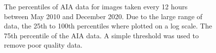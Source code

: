 \documentclass[11pt,a4paper,onecolumn]{report}
\begin{document}
\begin{figure}[t]%
  \qquad
  \qquad

  \caption[]{ The percentiles of AIA data for images
  taken every 12 hours between May 2010 and December 2020. Due to the large
  range of data, the 25th to 100th percentiles where plotted on a log scale.
   The 75th percentile of the AIA data. A simple
  threshold was used to remove poor quality data.}
  \label{fig:aia_data_prep}
\end{figure}
\end{document}

